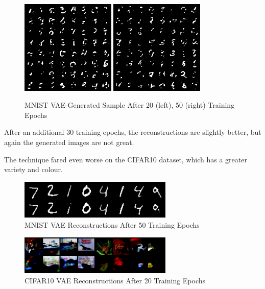 \documentclass[letterpaper, 10pt]{article}
\begin{document}
\newpage

\begin{figure}[h]
 \caption{MNIST VAE-Generated Sample After 20 (left), 50 (right) Training Epochs}
 \centering
 \includegraphics[width=0.4\textwidth]{mnist_vae_sample_20epochs}
 \includegraphics[width=0.4\textwidth]{mnist_vae_sample_50epochs}
\end{figure}

After an additional 30 training epochs, the reconstructions are slightly better, but
again the generated images are not great.

The technique fared even worse on the CIFAR10 dataset, which has a greater variety
and colour.

\begin{figure}[h]
 \caption{MNIST VAE Reconstructions After 50 Training Epochs}
 \centering
 \includegraphics[width=0.65\textwidth]{mnist_vae_reconstruction_50epochs}
\end{figure}


\begin{figure}[h]
 \caption{CIFAR10 VAE Reconstructions After 20 Training Epochs}
 \centering
 \includegraphics[width=0.65\textwidth]{cifar10_vae_reconstruction_20epochs}
\end{figure}
\end{document}
